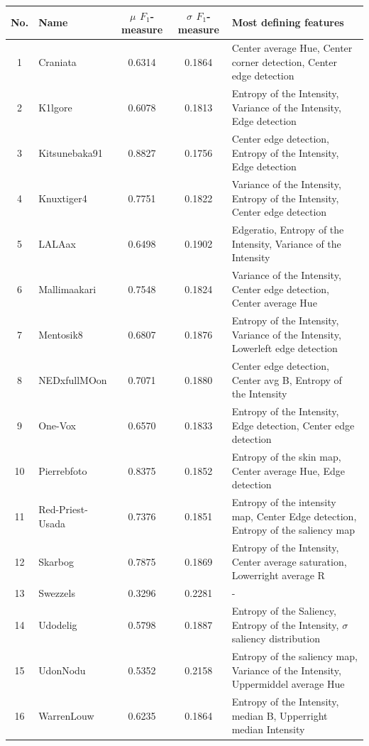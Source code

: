 \begin{table}[htb]
    \centering
    \begin{tabular}
        { | c | l | c | c | l | } 
        \hline
        No. & Name & $\mu$ $F_1$-measure & $\sigma$ $F_1$-measure & Most defining features\\
        \hline
    1 & Craniata &  0.6314 & 0.1864 & Center average Hue, Center corner detection, Center edge detection\\
    2 & K1lgore & 0.6078 & 0.1813 & Entropy of the Intensity, Variance of the Intensity, Edge detection \\
    3 & Kitsunebaka91 & 0.8827 & 0.1756 & Center edge detection, Entropy of the Intensity, Edge detection \\
    4 & Knuxtiger4 & 0.7751 & 0.1822 & Variance of the Intensity, Entropy of the Intensity, Center edge detection \\
    5 & LALAax & 0.6498 & 0.1902 & Edgeratio, Entropy of the Intensity, Variance of the Intensity \\
    6 & Mallimaakari & 0.7548 & 0.1824 & Variance of the Intensity, Center edge detection, Center average Hue\\
    7 & Mentosik8 & 0.6807 & 0.1876 & Entropy of the Intensity, Variance of the Intensity, Lowerleft edge detection \\ 
    8 & NEDxfullMOon & 0.7071 & 0.1880 & Center edge detection, Center avg B, Entropy of the Intensity\\
    9 & One-Vox & 0.6570 & 0.1833 & Entropy of the Intensity, Edge detection, Center edge detection  \\
    10 & Pierrebfoto & 0.8375 & 0.1852 & Entropy of the skin map, Center average Hue, Edge detection\\
    11 & Red-Priest-Usada & 0.7376 & 0.1851 & Entropy of the intensity map, Center Edge detection, Entropy of the saliency map\\
    12 & Skarbog & 0.7875 & 0.1869 & Entropy of the Intensity, Center average saturation, Lowerright average R \\
    13 & Swezzels & 0.3296 & 0.2281 & - \\ 
    14 & Udodelig & 0.5798 & 0.1887 & Entropy of the Saliency, Entropy of the Intensity, $\sigma$ saliency distribution \\
    15 & UdonNodu & 0.5352 & 0.2158 & Entropy of the saliency map, Variance of the Intensity, Uppermiddel average Hue \\ 
    16 & WarrenLouw & 0.6235 & 0.1864 & Entropy of the Intensity, median B, Upperright median Intensity\\

\end{tabular}
\end{table}

